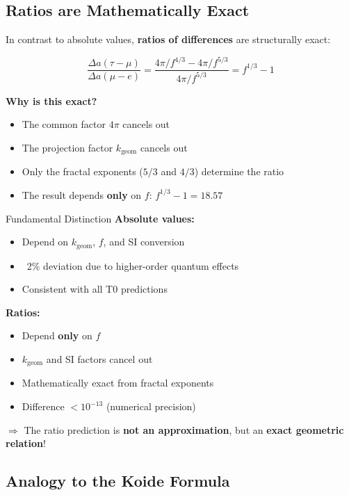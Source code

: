 	\subsection{Ratios are Mathematically Exact}
	
	In contrast to absolute values, \textbf{ratios of differences} are structurally exact:
	
	\begin{equation}
		\frac{\Delta a(\tau - \mu)}{\Delta a(\mu - e)} = \frac{4\pi/f^{4/3} - 4\pi/f^{5/3}}{4\pi/f^{5/3}} = f^{1/3} - 1
	\end{equation}
	
	\textbf{Why is this exact?}
	
	\begin{itemize}
		\item The common factor $4\pi$ cancels out
		\item The projection factor $k_{\text{geom}}$ cancels out
		\item Only the fractal exponents ($5/3$ and $4/3$) determine the ratio
		\item The result depends \textbf{only} on $f$: $f^{1/3} - 1 = 18.57$
	\end{itemize}
	
	\begin{important}{Fundamental Distinction}
		\textbf{Absolute values:}
		\begin{itemize}
			\item Depend on $k_{\text{geom}}$, $f$, and SI conversion
			\item ~2\% deviation due to higher-order quantum effects
			\item Consistent with all T0 predictions
		\end{itemize}
		
		\textbf{Ratios:}
		\begin{itemize}
			\item Depend \textbf{only} on $f$
			\item $k_{\text{geom}}$ and SI factors cancel out
			\item Mathematically exact from fractal exponents
			\item Difference $< 10^{-13}$ (numerical precision)
		\end{itemize}
		
		$\Rightarrow$ The ratio prediction is \textbf{not an approximation}, but an \textbf{exact geometric relation}!
	\end{important}
	
	\subsection{Analogy to the Koide Formula}
	
